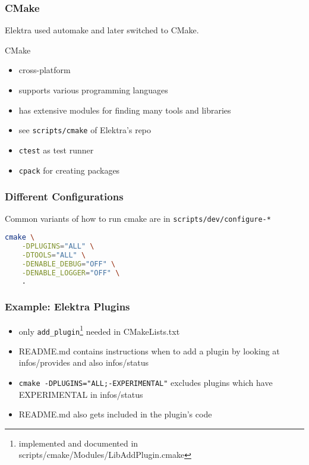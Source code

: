 \begin{frame}
	\frametitle{CMake}

	Elektra used automake and later switched to CMake.

	\vspace{1cm}

	CMake

	\begin{itemize}[<+-| alert@+>]
	\item cross-platform
	\item supports various programming languages
	\item has extensive modules for finding many tools and libraries
	\item see \texttt{scripts/cmake} of Elektra's repo
	\item \texttt{ctest} as test runner
	\item \texttt{cpack} for creating packages
	\end{itemize}
\end{frame}

\begin{frame}[fragile]
	\frametitle{Different Configurations}

	Common variants of how to run cmake are in \texttt{scripts/dev/configure-*}

	\begin{lstlisting}[language=sh]
cmake \
	-DPLUGINS="ALL" \
	-DTOOLS="ALL" \
	-DENABLE_DEBUG="OFF" \
	-DENABLE_LOGGER="OFF" \
	.\end{lstlisting}
\end{frame}

\begin{frame}
	\frametitle{Example: Elektra Plugins}

	\begin{itemize}[<+-| alert@+>]
	\item only \texttt{add_plugin}\footnote{implemented and documented in scripts/cmake/Modules/LibAddPlugin.cmake} needed in CMakeLists.txt
	\item README.md contains instructions when to add a plugin by looking at infos/provides and also infos/status
	\item \texttt{cmake -DPLUGINS="ALL;-EXPERIMENTAL"} excludes plugins which have EXPERIMENTAL in infos/status
	\item README.md also gets included in the plugin's code
	\end{itemize}
\end{frame}

